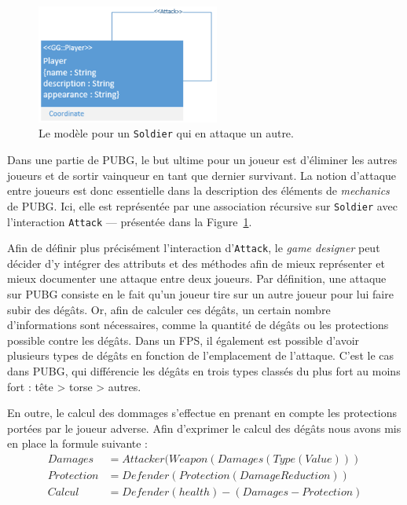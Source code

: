\begin{figure}
    \centering
    \includegraphics[width=6cm]{10_img/chap6/attack_min.PNG}
    \caption{Le mod\`ele pour un \texttt{Soldier} qui en attaque un autre.}
    \label{fig.PUBG_attack_min}
\end{figure}

Dans une partie de PUBG, le but ultime pour un joueur est d'éliminer les autres joueurs et de sortir vainqueur en tant que dernier survivant. La notion d'attaque entre joueurs est donc essentielle dans la description des éléments de \emph{mechanics} de PUBG. Ici, elle est représentée par une association récursive sur \texttt{Soldier} avec l'interaction \texttt{Attack} --- présentée dans la Figure~\ref{fig.PUBG_attack_min}. 

Afin de définir plus précisément l'interaction d'\texttt{Attack}, le \emph{game designer} peut décider d'y intégrer des attributs et des méthodes afin de mieux représenter et mieux documenter une attaque entre deux joueurs. Par définition, une attaque sur PUBG consiste en le fait qu'un joueur tire sur un autre joueur pour lui faire subir des dégâts.
%
Or, afin de calculer ces dégâts, un certain nombre d'informations sont n\'ecessaires, comme la quantité de dégâts ou les protections possible contre les dégâts.
Dans un FPS, il également est possible d'avoir plusieurs types de dégâts en fonction de l'emplacement de l'attaque.
C'est le cas dans PUBG, qui différencie les dégâts en trois types classés du plus fort au moins fort : tête > torse > autres.

\begin{samepage}
En outre, le calcul des dommages s'effectue en prenant en compte les protections portées par le joueur adverse.
Afin d'exprimer le calcul des dégâts nous avons mis en place la formule suivante :
%
\begin{equation*}
\begin{split}
Damages& = Attacker(Weapon(Damages(Type(Value)))\\
Protection& = Defender(Protection(DamageReduction))\\
Calcul& = Defender(health) - (Damages - Protection)
\end{split}
\end{equation*}

\end{samepage}

